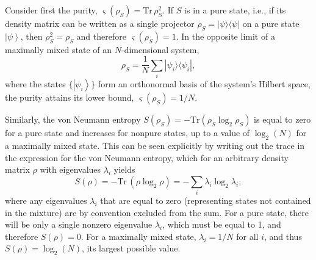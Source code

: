 \documentclass[3p,sort&compress]{elsarticle}
\newcommand{\ket}[1]{\left\vert{#1}\right\rangle}
\newcommand{\ketbra}[2]{\ensuremath{|{#1 \rangle}{\langle #2}|}}
\newcommand{\op}[1]{#1}
\begin{document}
Consider first the purity, $\varsigma(\op{\rho}_S) = \text{Tr} \,\op{\rho}_S^2$. If $S$ is in a pure state, i.e., if its density matrix can be written as a single projector $\op{\rho}_S=\ketbra{\psi}{\psi}$ on a pure state $\ket{\psi}$, then $\op{\rho}_S^2=\op{\rho}_S$ and therefore $\varsigma(\op{\op{\rho}}_S) =1$. In the opposite limit of a maximally mixed state of an $N$-dimensional system,
%
\begin{equation}
\label{eq:msd}
  \op{\rho}_S = \frac{1}{N} \sum_{i}  \ketbra{\psi_i}{\psi_i},
\end{equation}
%
where the states $\{\ket{\psi_i}\}$ form an orthonormal basis of the system's Hilbert space, the purity attains its lower bound, $\varsigma(\op{\rho}_S) =1/N$. 

Similarly, the von Neumann entropy $S(\op{\rho}_S) = - \text{Tr}\left( \op{\rho}_S \log_2 \op{\rho}_S \right)$ is equal to zero for a pure state and increases for nonpure states, up to a value of $\log_2 (N)$ for a maximally mixed state. This can be seen explicitly by writing out the trace in the expression for the von Neumann entropy, which for an arbitrary density matrix $\op{\rho}$ with eigenvalues $\lambda_i$ yields
%
\begin{equation}\label{eq:ojibef00011}
  S(\op{\rho}) = - \text{Tr} \, ( \op{\rho} \log_2 \op{\rho} ) =
  - \sum_i \lambda_i \log_2 \lambda_i,
\end{equation}
%
where any eigenvalues $\lambda_i$ that are equal to zero (representing states not contained in the mixture) are by convention excluded from the sum. For a pure state, there will be only a single nonzero eigenvalue $\lambda_i$, which must be equal to 1, and therefore $S(\op{\rho}) = 0$. For a maximally mixed state, $\lambda_i=1/N$ for all $i$, and thus $S(\op{\rho}) = \log_2 (N)$, its largest possible value. 
\end{document}
